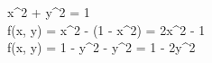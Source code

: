 x^2 + y^2 = 1 \implies \\
f(x, y) = x^2 - (1 - x^2) = 2x^2 - 1  \\
f(x, y) = 1 - y^2 - y^2 = 1 - 2y^2 